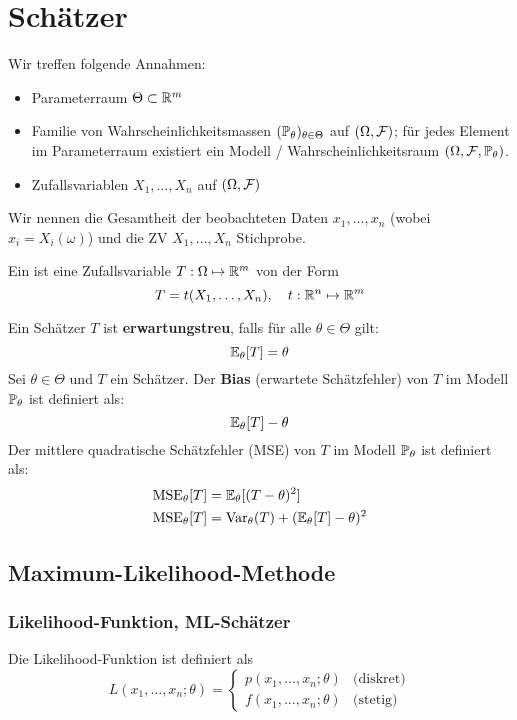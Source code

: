 \section{Schätzer}

Wir treffen folgende Annahmen:
\begin{itemize}
	\item Parameterraum \(\Theta \subset \R^m\)
	\item Familie von Wahrscheinlichkeitsmassen \((\P_\theta)_{\theta \in \Theta}\) auf \((\Omega, \F)\); 
    für jedes Element im Parameterraum existiert ein Modell / Wahrscheinlichkeitsraum $(\Omega, \F, \P_{\theta})$.
	\item Zufallsvariablen \(X_1, \ldots, X_n\) auf \((\Omega, \F)\)
\end{itemize}
Wir nennen die Gesamtheit der beobachteten Daten \(x_1, \ldots, x_n\) (wobei $x_i = X_i(\omega)$) und die ZV \(X_1, \ldots, X_n\) Stichprobe.
\begin{mainbox}{}
	Ein  ist eine Zufallsvariable \(T: \Omega \mapsto \R^m\) von der Form
	\[T = t(X_1, \ldots, X_n), \quad t: \R^n \mapsto \R^m\]
\end{mainbox}
Ein Schätzer \(T\) ist \textbf{erwartungstreu}, falls für alle \(\theta \in \Theta\) gilt:
\[\E_\theta [T] = \theta\]
Sei \(\theta \in \Theta\) und \(T\) ein Schätzer. Der \textbf{Bias} (erwartete Schätzfehler) von \(T\) im Modell \(\P_\theta\) ist definiert als:
\[\E_\theta[T]-\theta\]
Der mittlere quadratische Schätzfehler (MSE) von \(T\) im Modell \(\P_\theta\) ist definiert als:
\begin{align*}
	\text{MSE}_\theta[T] & = \E_\theta[(T-\theta)^2]                    \\
	\text{MSE}_\theta[T] & = \Var_\theta(T) + (\E_\theta[T] - \theta)^2
\end{align*}

\subsection{Maximum-Likelihood-Methode}
\subsubsection{Likelihood-Funktion, ML-Schätzer}
Die Likelihood-Funktion ist definiert als
\[L(x_1, \ldots, x_n; \theta) = \begin{cases}
		p(x_1, \ldots, x_n; \theta) & \text{(diskret)} \\
		f(x_1, \ldots, x_n; \theta) & \text{(stetig)}
	\end{cases} \]


